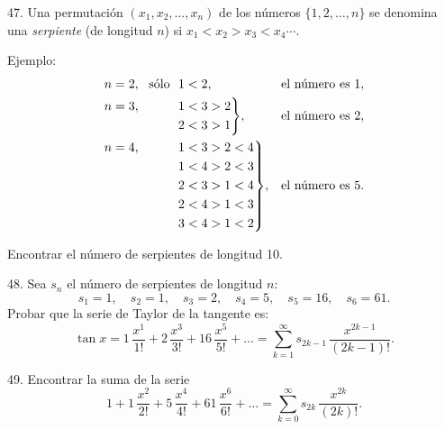 \begin{problem}{47.}
	Una permutaci\'on $(x_1,x_2, \dotsc,x_n)$ de los n\'umeros $\{1, 2, \dotsc, n\}$ se denomina una
	\emph{serpiente} (de longitud $n$) si $x_1<x_2>x_3<x_4 \dotsb$.

	\begin{note}{Ejemplo:}
\begin{equation*}
			\begin{aligned}[t]
				&\begin{aligned}[t] n=2, \text{\ \ s\'olo\ \ } 1<2, \end{aligned} &&\text{el n\'umero es }1, \\
				&\hskip-\nulldelimiterspace\mathord{\left.\begin{aligned} n=3, \hphantom{\text{\ \ s\'olo\ \ }} 1&<3>2 \\ 
				2&<3>1\end{aligned} \right\}}, && \text{el n\'umero es }2, \\
				&\hskip-\nulldelimiterspace\mathord{\left.\begin{aligned} n=4, \hphantom{\text{\ \ s\'olo\ \ }} 1&<3>2<4 \\ 
				1&<4>2<3 \\ 
				2&<3>1<4 \\ 
				2&<4>1<3 \\ 
				3&<4>1<2\end{aligned} \right\}},
				&&\text{el n\'umero es }5. \\
			\end{aligned}
		\end{equation*}
	\end{note}
	Encontrar el n\'umero de serpientes de longitud 10.
\end{problem}

\begin{problem}{48.}
	Sea $s_n$ el n\'umero de serpientes de longitud $n$:
	\begin{equation*}
	s_1=1, \quad s_2=1, \quad s_3=2, \quad s_4=5, \quad s_5=16, \quad s_6=61.
	\end{equation*}
	Probar que la serie de Taylor de la tangente es:
	\begin{equation*}
		\tan x=1\, \frac{x^1}{1!}+2\, \frac{x^3}{3!}+16\, \frac{x^5}{5!}+\dots=
		\textstyle\sum\limits_{k=1}^{\infty} s_{2k-1}\, \frac{x^{2k-1}}{(2k-1)!}.
	\end{equation*}
\end{problem}

\begin{problem}{49.}
	Encontrar la suma de la serie
	\begin{equation*}
		1+1\, \frac{x^2}{2!}+5\, \frac{x^4}{4!}+61\, \frac{x^6}{6!}+\dots=
		\textstyle\sum\limits_{k=0}^{\infty} s_{2k}\,\frac{x^{2k}}{(2k)!}.
	\end{equation*}
\end{problem}

